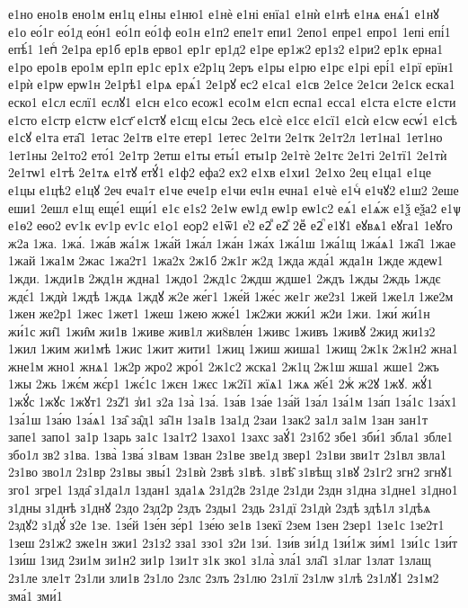 {е1но
ено1в
ено1м
ен1ц
е1ны
е1ню1
е1нѐ
е1ні
енїа1
е1нѝ
е1нѣ
е1нѧ
енѧ́1
е1нꙋ
е1о
ео́1г
ео́1д
ео́н1
ео́1п
ео́1ф
ео1н
е1п2
епе1т
епи1
2епо1
епре1
епро1
1епі
епі́1
епѣ́1
1епⷭ
2е1ра
ер1б
ер1в
ерво1
ер1г
ер1д2
е1ре
ер1ж2
ер1з2
е1ри2
ер1к
ерна1
е1ро
еро1в
еро1м
ер1п
ер1с
ер1х
е2р1ц
2еръ
е1ры
е1рю
е1рє
е1рі
ері́1
е1рї
ерїн1
е1рѝ
е1рѡ
ерѡ1н
2е1рѣ1
е1рѧ
ерѧ́1
2е1рꙋ
ес2
е1са1
е1св
2е1се
2е1си
2е1ск
еска1
еско1
е1сл
еслї1
еслꙋ1
е1сн
е1со
есож1
есо1м
е1сп
еспа1
есса1
е1ста
е1сте
е1сти
е1сто
е1стр
е1стѡ
е1ст҃
е1стꙋ
е1сщ
е1сы
2есь
е1сѐ
е1сє
е1сї1
е1сѝ
е1сѡ
есѡ́1
е1сѣ
е1сꙋ
е1та
ета̑1
1етас
2е1тв
е1те
етер1
1етес
2е1ти
2е1тк
2е1т2л
1ет1на1
1ет1но
1ет1ны
2е1то2
ето́1
2е1тр
2етш
е1ты
еты́1
еты1р
2е1тѐ
2е1тє
2е1ті
2е1тї1
2е1тѝ
2е1тѡ1
е1тѣ
2е1тѧ
е1тꙋ
етꙋ́1
е1ф2
ефа2
ех2
е1хв
е1хи1
2е1хо
2ец
е1ца1
е1це
е1цы
е1цѣ2
е1цꙋ
2еч
еча1т
е1че
ече1р
е1чи
еч1н
ечна1
е1чѐ
е1чⷭ
е1чꙋ2
е1ш2
2еше
еши1
2ешл
е1щ
еще́1
ещи́1
е1є
е1ѕ2
2е1ѡ
еѡ1д
еѡ1р
еѡ1с2
еѧ́1
е1ѧ́ж
е1ѯ
еѯа2
е1ѱ
е1ѳ2
еѳо2
еѵ1к
еѵ1р
еѵ1с
е1ѻ1
еѻр2
е1ѿ1
е҆2
е2ⷡ
е2ⷦ
2еⷨ
е2ⷫ
е1ꙋ1
еꙋвѧ1
еꙋга1
1еꙋго
ж2а
1жа.
1жа́.
1жа́в
жа́1ж
1жа́й
1жа́л
1жа́н
1жа́х
1жа́1ш
1жа́1щ
1жа́ѧ1
1жа̑1
1жае
1жай
1жа1м
2жас
1жа2т1
1жа2х
2ж1б
2ж1г
ж2д
1жда
жда́1
жда1н
1жде
ждеѡ1
1жди.
1жди1в
2жд1н
ждна1
1ждо1
2жд1с
2ждш
ждше1
2ждъ
1жды
2ждь
1ждє
ждє́1
1ждѝ
1ждѣ
1ждѧ
1ждꙋ
ж2е
же́г1
1же́й
1же́с
же1г
же2з1
1жей
1же1л
1же2м
1жен
же2р1
1жес
1жет1
1жеш
1жею
жже́1
1ж2жи
жжи́1
ж2и
1жи.
1жи́
жи́1н
жи́1с
жи̑1
1жи̑м
жи1в
1живе
жив1л
жи8вле́н
1живс
1живъ
1живꙋ
2жид
жи1з2
1жил
1жим
жи1мѣ
1жис
1жит
жити1
1жиц
1жиш
жиша1
1жищ
2ж1к
2ж1н2
жна1
жне1м
жно1
жнѧ1
1ж2р
жро2
жро́1
2ж1с2
жска1
2ж1ц
2ж1ш
жша1
жше1
2жъ
1жы
2жь
1жє́м
жє́р1
1жє́1с
1жєн
1жєс
1ж2ї1
жїѧ1
1жѧ
ж҃е́1
2жⷭ
ж2ꙋ
1жꙋ.
жꙋ́1
1жꙋ́с
1жꙋс
1жꙋт1
2з2̾1
з̾и1
з2а
1за̀
1за́.
1за́в
1за́е
1за́й
1за́л
1за́1м
1за́п
1за́1с
1за́х1
1за́1ш
1за́ю
1за́ѧ1
1за̑
за̑д1
за̑1н
1за1в
1за1д
2заи
1зак2
за1л
за1м
1зан
зан1т
запе1
запо1
за1р
1зарь
за1с
1за1т2
1захо1
1захс
заꙋ́1
2з1б2
збе1
зби́1
збла1
збле1
збо1л
зв2
з1ва.
1зва̀
1зва́
з1вам
1зван
2з1ве
зве1д
звер1
2з1ви
зви1т
2з1вл
звла1
2з1во
зво1л
2з1вр
2з1вы
звы́1
2з1вѝ
2звѣ
з1вѣ.
з1вѣ̑
з1вѣщ
з1вꙋ
2з1г2
згн2
згнꙋ1
зго1
згре1
1зда̑
з1да1л
1здан1
зда1ѧ
2з1д2в
2з1де
2з1ди
2здн
з1дна
з1дне1
з1дно1
з1дны
з1днѣ
з1днꙋ
2здо
2зд2р
2здъ
2зды1
2здь
2з1дї
2з1дѝ
2здѣ
здѣ1л
з1дѣѧ
2здꙋ2
з1дꙋ́
з2е
1зе.
1зе́й
1зе́н
зе́р1
1зе́ю
зе1в
1зекї
2зем
1зен
2зер1
1зе1с
1зе2т1
1зеш
2з1ж2
зже1н
зжи1
2з1з2
зза1
ззо1
з2и
1зи́.
1зи́в
зи́1д
1зи́1ж
зи́м1
1зи́1с
1зи́т
1зи́ш
1зид
2зи1м
зи1н2
зи1р
1зи1т
з1к
зко1
з1ла̀
зла́1
зла̑1
з1лаг
1злат
1злащ
2з1ле
зле1т
2з1ли
зли1в
2з1ло
2злс
2злъ
2з1лю
2з1лї
2з1лѡ
з1лѣ
2з1лꙋ1
2з1м2
зма́1
зми́1
}
